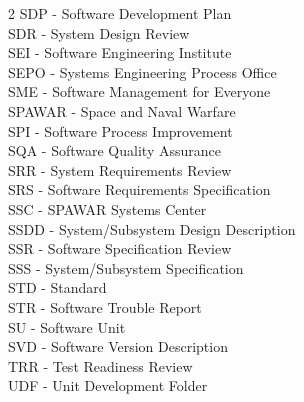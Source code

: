 \begin{multicols}{2}
SDP - Software Development Plan \\
SDR - System Design Review \\
SEI - Software Engineering Institute \\
SEPO - Systems Engineering Process Office \\
SME - Software Management for Everyone \\
SPAWAR - Space and Naval Warfare \\
SPI - Software Process Improvement \\
SQA - Software Quality Assurance \\
SRR - System Requirements Review \\
SRS - Software Requirements Specification \\
SSC - SPAWAR Systems Center \\
SSDD - System/Subsystem Design Description \\
SSR - Software Specification Review \\
SSS - System/Subsystem Specification \\
STD - Standard \\
STR - Software Trouble Report \\
SU - Software Unit \\
SVD - Software Version Description \\
TRR - Test Readiness Review \\
UDF - Unit Development Folder \\
\end{multicols}
